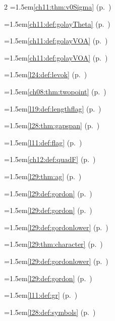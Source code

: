 \begin{multicols}{2}
\hangindent=1.5em\quad \ref{ch11:thm:v0Sigma} (p.~\pageref{ch11:thm:v0Sigma})\par
\hangindent=1.5em\quad \ref{ch11:def:golayTheta} (p.~\pageref{ch11:def:golayTheta})\par
\hangindent=1.5em\quad \ref{ch11:def:golayVOA} (p.~\pageref{ch11:def:golayVOA})\par
\hangindent=1.5em\quad \ref{ch11:def:golayVOA} (p.~\pageref{ch11:def:golayVOA})\par
\hangindent=1.5em\quad \ref{l24:def:levok} (p.~\pageref{l24:def:levok})\par
\hangindent=1.5em\quad \ref{ch08:thm:twopoint} (p.~\pageref{ch08:thm:twopoint})\par
\hangindent=1.5em\quad \ref{l19:def:lengthflag} (p.~\pageref{l19:def:lengthflag})\par
\hangindent=1.5em\quad \ref{l28:thm:gapspan} (p.~\pageref{l28:thm:gapspan})\par
\hangindent=1.5em\quad \ref{l11:def:flag} (p.~\pageref{l11:def:flag})\par
\hangindent=1.5em\quad \ref{ch12:def:quadF} (p.~\pageref{ch12:def:quadF})\par
\hangindent=1.5em\quad \ref{l29:thm:ag} (p.~\pageref{l29:thm:ag})\par
\hangindent=1.5em\quad \ref{l29:def:gordon} (p.~\pageref{l29:def:gordon})\par
\hangindent=1.5em\quad \ref{l29:def:gordon} (p.~\pageref{l29:def:gordon})\par
\hangindent=1.5em\quad \ref{l29:def:gordonlower} (p.~\pageref{l29:def:gordonlower})\par
\hangindent=1.5em\quad \ref{l29:thm:character} (p.~\pageref{l29:thm:character})\par
\hangindent=1.5em\quad \ref{l29:def:gordonlower} (p.~\pageref{l29:def:gordonlower})\par
\hangindent=1.5em\quad \ref{l29:def:gordon} (p.~\pageref{l29:def:gordon})\par
\hangindent=1.5em\quad \ref{l11:def:gr} (p.~\pageref{l11:def:gr})\par
\hangindent=1.5em\quad \ref{l28:def:symbols} (p.~\pageref{l28:def:symbols})\par

\end{multicols}
